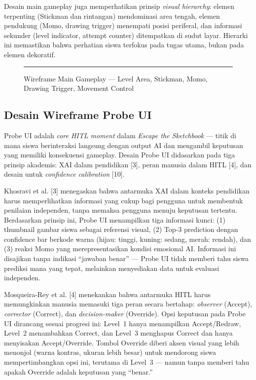 \documentclass[12pt,oneside]{report}
\begin{document}
Desain main gameplay juga memperhatikan prinsip \textit{visual hierarchy}: elemen terpenting (Stickman dan rintangan) mendominasi area tengah, elemen pendukung (Momo, drawing trigger) menempati posisi periferal, dan informasi sekunder (level indicator, attempt counter) ditempatkan di sudut layar. Hierarki ini memastikan bahwa perhatian siswa terfokus pada tugas utama, bukan pada elemen dekoratif.

\begin{figure}[H]
    \centering
    \rule{0.9\textwidth}{6cm}
    \caption{Wireframe Main Gameplay --- Level Area, Stickman, Momo, Drawing Trigger, Movement Control}
    \label{fig:wireframe-main-gameplay}
\end{figure}


\subsection{Desain Wireframe Probe UI}
\label{subsec:wireframe-probe-ui}

Probe UI adalah \textit{core HITL moment} dalam \textit{Escape the Sketchbook} --- titik di mana siswa berinteraksi langsung dengan output AI dan mengambil keputusan yang memiliki konsekuensi gameplay. Desain Probe UI didasarkan pada tiga prinsip akademis: XAI dalam pendidikan [3], peran manusia dalam HITL [4], dan desain untuk \textit{confidence calibration} [10].

Khosravi et al. [3] menegaskan bahwa antarmuka XAI dalam konteks pendidikan harus memperlihatkan informasi yang cukup bagi pengguna untuk membentuk penilaian independen, tanpa memaksa pengguna menuju keputusan tertentu. Berdasarkan prinsip ini, Probe UI menampilkan tiga informasi kunci: (1) thumbnail gambar siswa sebagai referensi visual, (2) Top-3 prediction dengan confidence bar berkode warna (hijau: tinggi, kuning: sedang, merah: rendah), dan (3) reaksi Momo yang merepresentasikan kondisi emosional AI. Informasi ini disajikan tanpa indikasi ``jawaban benar'' --- Probe UI tidak memberi tahu siswa prediksi mana yang tepat, melainkan menyediakan data untuk evaluasi independen.

Mosqueira-Rey et al. [4] menekankan bahwa antarmuka HITL harus memungkinkan manusia memasuki tiga peran secara bertahap: \textit{observer} (Accept), \textit{corrector} (Correct), dan \textit{decision-maker} (Override). Opsi keputusan pada Probe UI dirancang sesuai progresi ini: Level~1 hanya menampilkan Accept/Redraw, Level~2 menambahkan Correct, dan Level~3 menghapus Correct dan hanya menyisakan Accept/Override. Tombol Override diberi aksen visual yang lebih menonjol (warna kontras, ukuran lebih besar) untuk mendorong siswa mempertimbangkan opsi ini, terutama di Level~3 --- namun tanpa memberi tahu apakah Override adalah keputusan yang ``benar.''
\end{document}
